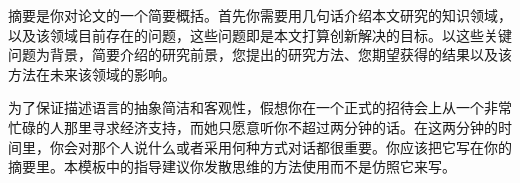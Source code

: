 \begin{CJK*}{UTF8}{gbsn}

摘要是你对论文的一个简要概括。首先你需要用几句话介绍本文研究的知识领域，以及该领域目前存在的问题，这些问题即是本文打算创新解决的目标。以这些关键问题为背景，简要介绍的研究前景，您提出的研究方法、您期望获得的结果以及该方法在未来该领域的影响。

为了保证描述语言的抽象简洁和客观性，假想你在一个正式的招待会上从一个非常忙碌的人那里寻求经济支持，而她只愿意听你不超过两分钟的话。在这两分钟的时间里，你会对那个人说什么或者采用何种方式对话都很重要。你应该把它写在你的摘要里。本模板中的指导建议你发散思维的方法使用而不是仿照它来写。

\end{CJK*}